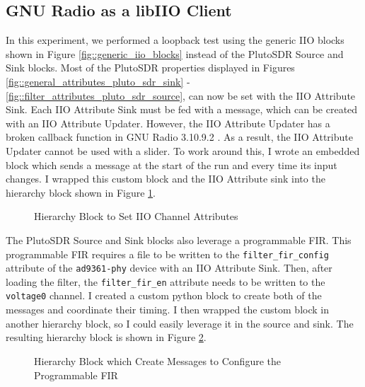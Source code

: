 \documentclass{article}
\begin{document}
\subsection{GNU Radio as a libIIO Client}

In this experiment, we performed a loopback test using the generic IIO blocks shown in Figure \ref{fig::generic_iio_blocks} instead of the PlutoSDR Source and Sink blocks. Most of the PlutoSDR properties displayed in Figures \ref{fig::general_attributes_pluto_sdr_sink} - \ref{fig::filter_attributes_pluto_sdr_source}, can now be set with the IIO Attribute Sink. Each IIO Attribute Sink must be fed with a message, which can be created with an IIO Attribute Updater. However, the IIO Attribute Updater has a broken callback function in GNU Radio 3.10.9.2 \cite{analog_devices_broken_iio_block}. As a result, the IIO Attribute Updater cannot be used with a slider. To work around this, I wrote an embedded block which sends a message at the start of the run and every time its input changes. I wrapped this custom block and the IIO Attribute sink into the hierarchy block shown in Figure \ref{fig::iio_input_channel_attribute}.

\begin{figure}[H]
	\centerline{}
	\caption{Hierarchy Block to Set IIO Channel Attributes}
	\label{fig::iio_input_channel_attribute}
\end{figure}

The PlutoSDR Source and Sink blocks also leverage a programmable FIR. This programmable FIR requires a file to be written to the \texttt{filter\_fir\_config} attribute of the \texttt{ad9361-phy} device with an IIO Attribute Sink. Then, after loading the filter, the \texttt{filter\_fir\_en} attribute needs to be written to the \texttt{voltage0} channel. I created a custom python block to create both of the messages and coordinate their timing. I then wrapped the custom block in another hierarchy block, so I could easily leverage it in the source and sink. The resulting hierarchy block is shown in Figure \ref{fig::iio_fir_config}.

\begin{figure}[H]
	\centerline{}
	\caption{Hierarchy Block which Create Messages to Configure the Programmable FIR}
	\label{fig::iio_fir_config}
\end{figure}
\end{document}
